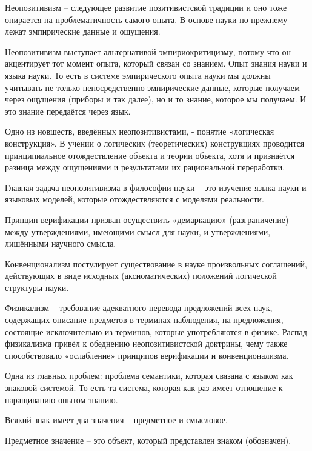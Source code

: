 \documentclass[exam_answers.tex]{subfiles}
\begin{document}
\renewcommand{\baselinestretch}{\blch}

Неопозитивизм – следующее развитие позитивистской традиции и оно тоже опирается на проблематичность самого опыта.
В основе науки по-прежнему лежат эмпирические данные и ощущения.

Неопозитивизм выступает альтернативой эмпириокритицизму, потому что он акцентирует тот момент опыта, который связан со знанием.
Опыт знания науки и языка науки.
То есть в системе эмпирического опыта науки мы должны учитывать не только непосредственно эмпирические данные, которые получаем через ощущения (приборы и так далее), но и то знание, которое мы получаем.
И это знание передаётся через язык.

Одно из новшеств, введённых неопозитивистами, - понятие «логическая конструкция».
В учении о логических (теоретических) конструкциях проводится принципиальное отождествление объекта и теории объекта, хотя и признаётся разница между ощущениями и результатами их рациональной переработки.

Главная задача неопозитивизма в философии науки – это изучение языка науки и языковых моделей, которые отождествляются с моделями реальности.

Принцип верификации призван осуществить «демаркацию» (разграничение) между утверждениями, имеющими смысл для науки, и утверждениями, лишёнными научного смысла.

Конвенционализм постулирует существование в науке произвольных соглашений, действующих в виде исходных (аксиоматических) положений логической структуры науки.

Физикализм – требование адекватного перевода предложений всех наук, содержащих описание предметов в терминах наблюдения, на предложения, состоящие исключительно из терминов, которые употребляются в физике.
Распад физикализма привёл к обеднению неопозитивистской доктрины, чему также способствовало «ослабление» принципов верификации и конвенционализма.

Одна из главных проблем: проблема семантики, которая связана с языком как знаковой системой.
То есть та система, которая как раз имеет отношение к наращиванию опытом знанию.

Всякий знак имеет два значения – предметное и смысловое.

Предметное значение – это объект, который представлен знаком (обозначен).
\end{document}
